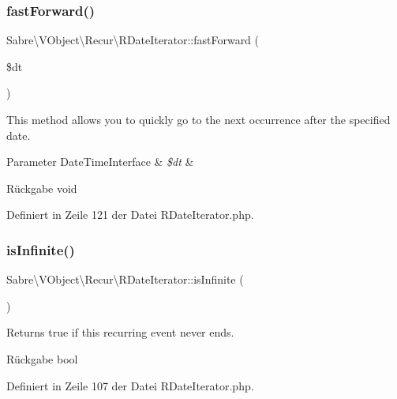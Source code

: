 \subsubsection{\texorpdfstring{fast\+Forward()}{fastForward()}}
{\footnotesize\ttfamily Sabre\textbackslash{}\+V\+Object\textbackslash{}\+Recur\textbackslash{}\+R\+Date\+Iterator\+::fast\+Forward (\begin{DoxyParamCaption}\item[{Date\+Time\+Interface}]{\$dt }\end{DoxyParamCaption})}

This method allows you to quickly go to the next occurrence after the specified date.


\begin{DoxyParams}[1]{Parameter}
Date\+Time\+Interface & {\em \$dt} & \\
\hline
\end{DoxyParams}
\begin{DoxyReturn}{Rückgabe}
void 
\end{DoxyReturn}


Definiert in Zeile 121 der Datei R\+Date\+Iterator.\+php.

\mbox{\label{class_sabre_1_1_v_object_1_1_recur_1_1_r_date_iterator_a5e8d99b21a968d3adc19846905e15ad9}} 
\subsubsection{\texorpdfstring{is\+Infinite()}{isInfinite()}}
{\footnotesize\ttfamily Sabre\textbackslash{}\+V\+Object\textbackslash{}\+Recur\textbackslash{}\+R\+Date\+Iterator\+::is\+Infinite (\begin{DoxyParamCaption}{ }\end{DoxyParamCaption})}

Returns true if this recurring event never ends.

\begin{DoxyReturn}{Rückgabe}
bool 
\end{DoxyReturn}


Definiert in Zeile 107 der Datei R\+Date\+Iterator.\+php.

